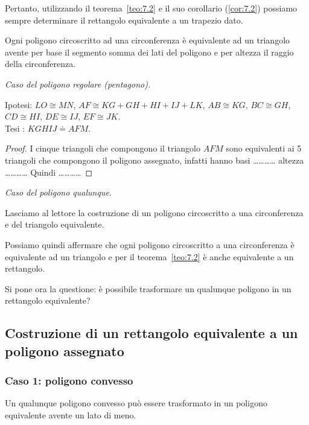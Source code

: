 Pertanto, utilizzando il teorema~\ref{teo:7.2} e il suo corollario 
(\ref{cor:7.2}) possiamo sempre determinare il rettangolo equivalente 
a un trapezio dato.

\begin{teorema}\label{teo:7.4}
Ogni poligono circoscritto ad una circonferenza è equivalente ad un 
triangolo avente per base il segmento somma dei lati del poligono e 
per altezza il raggio della circonferenza.
\end{teorema}

\noindent \emph{Caso del poligono regolare (pentagono).}\vspace{10pt}

\noindent Ipotesi: $LO\cong MN$, $AF\cong KG+GH+HI+IJ+LK$, $AB\cong 
KG$, $BC\cong GH$, $CD\cong HI$, $DE\cong IJ$, $EF\cong JK$.\\
Tesi : $KGHIJ\doteq AFM$.

\begin{figure*}[!htb]
	\centering
\end{figure*}

\begin{proof}
I cinque triangoli che compongono il triangolo $AFM$ sono equivalenti 
ai 5 triangoli che compongono il poligono assegnato, infatti hanno 
basi \ldots\ldots\ldots\ldots{} altezza \ldots\ldots\ldots\ldots{} 
Quindi \ldots\ldots\ldots\ldots{}
\end{proof}\vspace{10pt}

\noindent \emph{Caso del poligono qualunque.}\vspace{10pt}

\noindent Lasciamo al lettore la costruzione di un poligono 
circoscritto a una circonferenza e del triangolo 
equivalente.\vspace{10pt}

Possiamo quindi affermare che ogni poligono circoscritto a una 
circonferenza è equivalente ad un triangolo e per il 
teorema~\ref{teo:7.2} è anche equivalente a un rettangolo.

Si pone ora la questione: è possibile trasformare un qualunque 
poligono in un rettangolo equivalente?

\subsection{Costruzione di un rettangolo equivalente a un poligono 
assegnato}

\subsubsection{Caso 1: poligono convesso}
Un qualunque poligono convesso può essere trasformato in un poligono 
equivalente avente un lato di meno.

